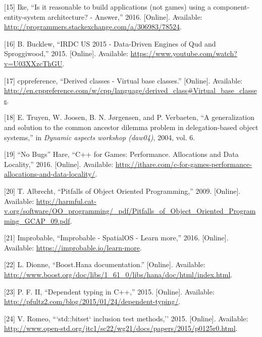 \documentclass[oneside, 12pt, a4paper, openany]{book}
\begin{document}
\hypertarget{ref-stackexchange_ixe_answer}{}
{[}15{]} Ike, ``Is it reasonable to build applications (not games) using
a component-entity-system architecture? - Answer,'' 2016. {[}Online{]}.
Available: \url{http://programmers.stackexchange.com/a/306983/78524}.

\hypertarget{ref-sproggiwood_irdc_2015_talk}{}
{[}16{]} B. Bucklew, ``IRDC US 2015 - Data-Driven Engines of Qud and
Sproggiwood,'' 2015. {[}Online{]}. Available:
\url{https://www.youtube.com/watch?v=U03XXzcThGU}.

\hypertarget{ref-cppreference_virtual_base_classes}{}
{[}17{]} cppreference, ``Derived classes - Virtual base classes.''
{[}Online{]}. Available:
\url{http://en.cppreference.com/w/cpp/language/derived_class\#Virtual_base_classes}.

\hypertarget{ref-truyen2004generalization}{}
{[}18{]} E. Truyen, W. Joosen, B. N. Jørgensen, and P. Verbaeten, ``A
generalization and solution to the common ancestor dilemma problem in
delegation-based object systems,'' in \emph{Dynamic aspects workshop
(daw04)}, 2004, vol. 6.

\hypertarget{ref-ithare_allocations}{}
{[}19{]} ``No Bugs'' Hare, ``C++ for Games: Performance. Allocations and
Data Locality,'' 2016. {[}Online{]}. Available:
\url{http://ithare.com/c-for-games-performance-allocations-and-data-locality/}.

\hypertarget{ref-scee_oop_pitfalls}{}
{[}20{]} T. Albrecht, ``Pitfalls of Object Oriented Programming,'' 2009.
{[}Online{]}. Available:
\url{http://harmful.cat-v.org/software/OO_programming/_pdf/Pitfalls_of_Object_Oriented_Programming_GCAP_09.pdf}.

\hypertarget{ref-spatialos_learnmore}{}
{[}21{]} Improbable, ``Improbable - SpatialOS - Learn more,'' 2016.
{[}Online{]}. Available: \url{https://improbable.io/learn-more}.

\hypertarget{ref-boosthana}{}
{[}22{]} L. Dionne, ``Boost.Hana documentation.'' {[}Online{]}.
Available:
\url{http://www.boost.org/doc/libs/1_61_0/libs/hana/doc/html/index.html}.

\hypertarget{ref-pfultz2_dependentyping}{}
{[}23{]} P. F. II, ``Dependent typing in C++,'' 2015. {[}Online{]}.
Available: \url{http://pfultz2.com/blog/2015/01/24/dependent-typing/}.

\hypertarget{ref-isocpp_proposal_p0125r0}{}
{[}24{]} V. Romeo, ```std::bitset` inclusion test methods,'' 2015.
{[}Online{]}. Available:
\url{http://www.open-std.org/jtc1/sc22/wg21/docs/papers/2015/p0125r0.html}.
\end{document}
